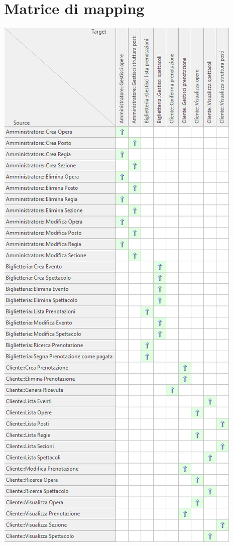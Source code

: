 \documentclass{article}
\begin{document}
    \section{Matrice di mapping}
        \includegraphics[height=\textheight]{imgs/matrice/matrice}
\end{document}
